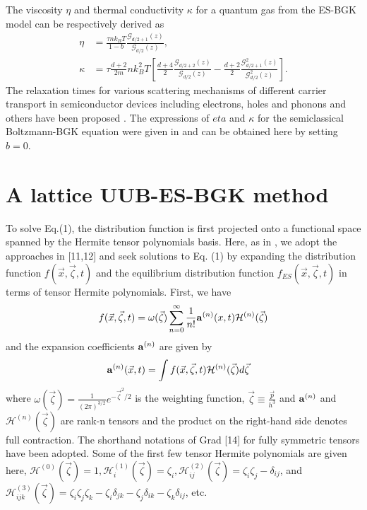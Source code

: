 \documentclass[doublecol]{epl2}
\begin{document}
The viscosity $\eta$ and thermal conductivity $\kappa$ for a quantum gas from the ES-BGK model can be respectively derived as
\begin{align}
\eta &= \frac{\tau n  k_B T}{1-b} \frac{\mathcal{G}_{d/2+1}(z)}{\mathcal{G}_{d/2}(z) }, \\
\kappa &= \tau \frac{d+2}{2m} n k_B^2 T [\frac{d+4}{2} \frac{\mathcal{G}_{d/2+2}(z)}{\mathcal{G}_{d/2}(z) } -\frac{d+2}{2}\frac{\mathcal{G}^2_{d/2+1}(z)}{\mathcal{G}^2_{d/2}(z)}].
\end{align}
The relaxation times for various scattering mechanisms of different carrier transport in semiconductor devices including electrons, holes and phonons and others have been proposed \cite{Lund2000, Chen2005}.  The expressions of $eta$ and $\kappa$ for the semiclassical Boltzmann-BGK equation were given in \cite{Shi2008} and can be obtained here by setting $b=0$.

\section{A lattice UUB-ES-BGK method}

To solve Eq.(1), the distribution function is first projected onto a functional space spanned by the Hermite tensor polynomials basis.
Here, as in \cite{Yang2009}, we adopt the approaches in [11,12] and seek solutions to Eq. (1) by expanding the distribution function $f(\vec x,\vec \zeta, t)$ and the equilibrium distribution function $f_{ES}(\vec x, \vec\zeta, t)$ in terms of tensor Hermite polynomials.  First, we have
\begin{align}
 f(\vec x,\vec\zeta ,t) =\omega (\vec\zeta )\sum _{n=0}^{\infty}
\frac{1}{n!} {\bf a}^{(n)}(x,t) {{\mathcal H}}^{(n)} (\vec\zeta )
\end{align}
and the expansion coefficients ${\bf a}^{(n)}$ are given by
\begin{align}
{\bf a}^{(n)} (\vec x,t)&=\int f(\vec x,\vec\zeta ,t) {{\mathcal H}}^{(n)}(\vec\zeta) d\vec\zeta
\label{eq:expasion_coefs}
\end{align}
where $\omega (\vec\zeta) = \frac{1}{(2\pi)^{3/2} } e^{-\vec\zeta^2/2}$ is the weighting function, $\vec\zeta \equiv \frac{\vec p}{h^3}$ and ${\bf a}^{(n)}$ and ${{\mathcal H} }^{(n)} (\vec\zeta )$ are rank-n tensors and the product on the right-hand side denotes full contraction.   The shorthand notations of Grad [14] for fully symmetric tensors have been adopted.
Some of the first few tensor Hermite polynomials are given here, ${{\mathcal H}}^{(0)} (\vec\zeta ) = 1, {{\mathcal H}} _{i}^{(1)} (\vec\zeta )=\zeta _{i}, {{\mathcal H}}_{ij}^{(2)} (\vec\zeta ) =\zeta _{i} \zeta _{j} - \delta _{ij}$, and ${{\mathcal H}}_{ijk}^{(3)} (\vec\zeta ) =\zeta _{i} \zeta _{j} \zeta _{k}-\zeta _{i}\delta_{jk} -\zeta _{j}\delta _{ik} -\zeta _{k} \delta _{ij}$, etc.
\end{document}
